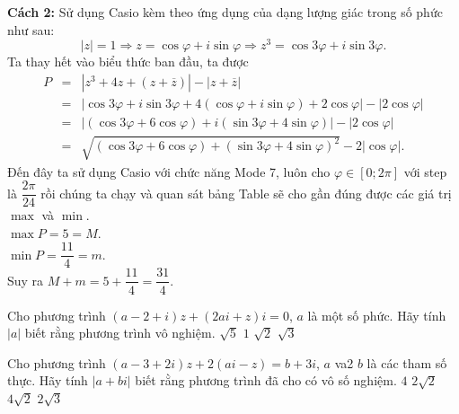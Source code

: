 \begin{ex}
{	\textbf{Cách 2:} Sử dụng Casio kèm theo ứng dụng của dạng lượng giác trong số phức như sau:
	$$|z|=1\Rightarrow z=\cos \varphi +i\sin \varphi \Rightarrow z^3=\cos 3\varphi +i\sin 3\varphi.$$
	Ta thay hết vào biểu thức ban đầu, ta được
	\begin{eqnarray*}
		P&=&|z^3+4z+(z+\overline{z})|-|z+\overline{z}|\\
		&=&|\cos 3\varphi +i\sin 3\varphi +4(\cos \varphi+i\sin \varphi)+2\cos \varphi|-|2\cos \varphi|\\
		&=&|(\cos 3\varphi +6\cos \varphi)+i(\sin 3\varphi +4\sin \varphi)|-|2\cos \varphi|\\
		&=&\sqrt{(\cos 3\varphi+6\cos \varphi)+(\sin 3\varphi +4\sin \varphi)^2}-2|\cos \varphi|.
	\end{eqnarray*}
	Đến đây ta sử dụng Casio với chức năng Mode 7, luôn cho $\varphi\in [0;2\pi]$ với step là $\dfrac{2\pi}{24}$ rồi chúng ta chạy và quan sát bảng Table sẽ cho gần đúng được các giá trị $\max$ và $\min$.\\
	$\max P=5=M$.\\
	$\min P=\dfrac{11}{4}=m$.\\
	Suy ra $M+m=5+\dfrac{11}{4}=\dfrac{31}{4}$.
}
\end{ex}
\begin{ex}%
	Cho phương trình $(a-2+i)z+(2ai+z)i=0$, $a$ là một số phức. Hãy tính $|a|$ biết rằng phương trình vô nghiệm.
	\choice
	{\True $\sqrt{5}$}
	{$1$}
	{$\sqrt{2}$}
	{$\sqrt{3}$}
\end{ex}
\begin{ex}%
	Cho phương trình $(a-3+2i)z+2(ai-z)=b+3i$, $a$ va2 $b$ là các tham số thực. Hãy tính $|a+bi|$ biết rằng phương trình đã cho có vô số nghiệm.
	\choice
	{$4$}
	{\True $2\sqrt{2}$}
	{$4\sqrt{2}$}
	{$2\sqrt{3}$}
\end{ex}



